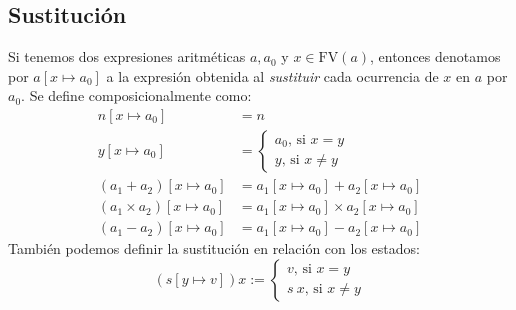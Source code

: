 \subsection{Sustitución}

Si tenemos dos expresiones aritméticas $a, a_0$ y $x\in \mathrm{FV}(a)$, entonces denotamos por $a[x \mapsto a_0]$ a la expresión obtenida al \textit{sustituir} cada ocurrencia de $x$ en $a$ por $a_0$. Se define composicionalmente como:
\begin{align*}
    n[x \mapsto a_0] & = n \\
    y[x \mapsto a_0] & = \begin{cases}a_0 \text{, si } x=y\\ y\text{, si } x\neq y\end{cases}\\
    (a_1+a_2)[x \mapsto a_0] & = a_1[x \mapsto a_0] + a_2[x \mapsto a_0]\\
    (a_1\times a_2)[x \mapsto a_0] & = a_1[x \mapsto a_0] \times a_2[x \mapsto a_0]\\
    (a_1-a_2)[x \mapsto a_0] & = a_1[x \mapsto a_0] - a_2[x \mapsto a_0]
\end{align*}
También podemos definir la sustitución en relación con los estados:
$$(s[y\mapsto v])x := \begin{cases}v\text{, si } x=y\\ s\ x \text{, si } x\neq y\end{cases}$$

